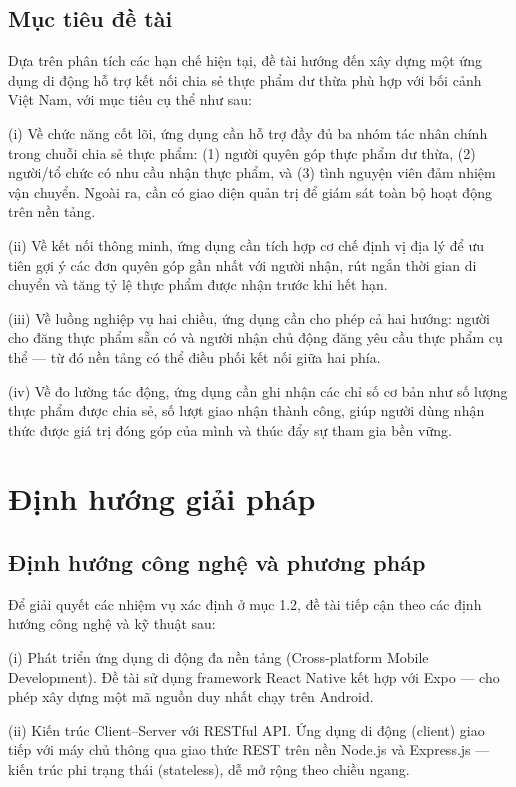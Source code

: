 \documentclass[../main.tex]{subfiles}%
\begin{document}
\subsection{Mục tiêu đề tài}
\label{subsection:1.2.3}

Dựa trên phân tích các hạn chế hiện tại, đề tài hướng đến xây dựng một ứng dụng di động hỗ trợ kết nối chia sẻ thực phẩm dư thừa phù hợp với bối cảnh Việt Nam, với mục tiêu cụ thể như sau:

(i) Về chức năng cốt lõi, ứng dụng cần hỗ trợ đầy đủ ba nhóm tác nhân chính trong chuỗi chia sẻ thực phẩm: (1) người quyên góp thực phẩm dư thừa, (2) người/tổ chức có nhu cầu nhận thực phẩm, và (3) tình nguyện viên đảm nhiệm vận chuyển. Ngoài ra, cần có giao diện quản trị để giám sát toàn bộ hoạt động trên nền tảng.

(ii) Về kết nối thông minh, ứng dụng cần tích hợp cơ chế định vị địa lý để ưu tiên gợi ý các đơn quyên góp gần nhất với người nhận, rút ngắn thời gian di chuyển và tăng tỷ lệ thực phẩm được nhận trước khi hết hạn.

(iii) Về luồng nghiệp vụ hai chiều, ứng dụng cần cho phép cả hai hướng: người cho đăng thực phẩm sẵn có và người nhận chủ động đăng yêu cầu thực phẩm cụ thể — từ đó nền tảng có thể điều phối kết nối giữa hai phía.

(iv) Về đo lường tác động, ứng dụng cần ghi nhận các chỉ số cơ bản như số lượng thực phẩm được chia sẻ, số lượt giao nhận thành công, giúp người dùng nhận thức được giá trị đóng góp của mình và thúc đẩy sự tham gia bền vững.

\section{Định hướng giải pháp}%
\label{section:1.3}

\subsection{Định hướng công nghệ và phương pháp}
\label{subsection:1.3.1}

Để giải quyết các nhiệm vụ xác định ở mục 1.2, đề tài tiếp cận theo các định hướng công nghệ và kỹ thuật sau:

(i) Phát triển ứng dụng di động đa nền tảng (Cross-platform Mobile Development). Đề tài sử dụng framework React Native kết hợp với Expo — cho phép xây dựng một mã nguồn duy nhất chạy trên Android. 

(ii) Kiến trúc Client–Server với RESTful API. Ứng dụng di động (client) giao tiếp với máy chủ thông qua giao thức REST trên nền Node.js và Express.js — kiến trúc phi trạng thái (stateless), dễ mở rộng theo chiều ngang.
\end{document}
